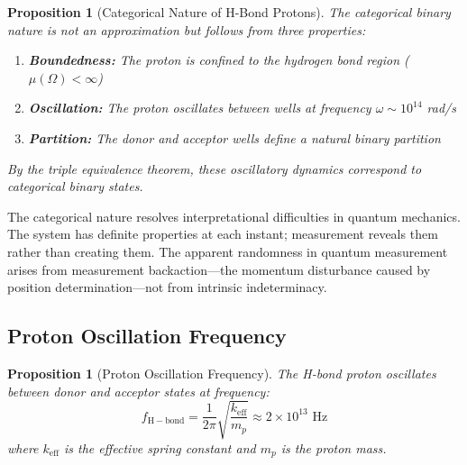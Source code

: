 \documentclass[twocolumn,10pt]{article}
\newtheorem{proposition}[theorem]{Proposition}
\theoremstyle{remark}
\begin{document}
\begin{proposition}[Categorical Nature of H-Bond Protons]
The categorical binary nature is not an approximation but follows from three properties:
\begin{enumerate}
\item \textbf{Boundedness:} The proton is confined to the hydrogen bond region ($\mu(\Omega) < \infty$)
\item \textbf{Oscillation:} The proton oscillates between wells at frequency $\omega \sim 10^{14}$ rad/s
\item \textbf{Partition:} The donor and acceptor wells define a natural binary partition
\end{enumerate}
By the triple equivalence theorem, these oscillatory dynamics correspond to categorical binary states.
\end{proposition}

The categorical nature resolves interpretational difficulties in quantum mechanics. The system has definite properties at each instant; measurement reveals them rather than creating them. The apparent randomness in quantum measurement arises from measurement backaction---the momentum disturbance caused by position determination---not from intrinsic indeterminacy.

\subsection{Proton Oscillation Frequency}

\begin{proposition}[Proton Oscillation Frequency]
\label{prop:proton_freq}
The H-bond proton oscillates between donor and acceptor states at frequency:
\begin{equation}
f_{\mathrm{H-bond}} = \frac{1}{2\pi}\sqrt{\frac{k_{\mathrm{eff}}}{m_p}} \approx 2 \times 10^{13} \text{ Hz}
\end{equation}
where $k_{\mathrm{eff}}$ is the effective spring constant and $m_p$ is the proton mass.
\end{proposition}
\end{document}
